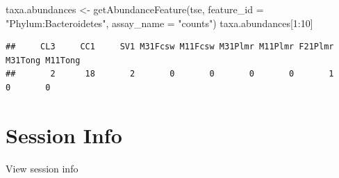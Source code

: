 \documentclass[
]{book}
\newenvironment{Shaded}{\begin{snugshade}}{\end{snugshade}}
\newcommand{\AttributeTok}[1]{\textcolor[rgb]{0.77,0.63,0.00}{#1}}
\newcommand{\DecValTok}[1]{\textcolor[rgb]{0.00,0.00,0.81}{#1}}
\newcommand{\FunctionTok}[1]{\textcolor[rgb]{0.00,0.00,0.00}{#1}}
\newcommand{\NormalTok}[1]{#1}
\newcommand{\OtherTok}[1]{\textcolor[rgb]{0.56,0.35,0.01}{#1}}
\newcommand{\SpecialCharTok}[1]{\textcolor[rgb]{0.00,0.00,0.00}{#1}}
\newcommand{\StringTok}[1]{\textcolor[rgb]{0.31,0.60,0.02}{#1}}
\begin{document}
\begin{Shaded}
\begin{Highlighting}[]
\NormalTok{taxa.abundances }\OtherTok{\textless{}{-}} \FunctionTok{getAbundanceFeature}\NormalTok{(tse, }
                                      \AttributeTok{feature\_id =} \StringTok{"Phylum:Bacteroidetes"}\NormalTok{,}
                                      \AttributeTok{assay\_name =} \StringTok{"counts"}\NormalTok{)}
\NormalTok{taxa.abundances[}\DecValTok{1}\SpecialCharTok{:}\DecValTok{10}\NormalTok{]}
\end{Highlighting}
\end{Shaded}

\begin{verbatim}
##     CL3     CC1     SV1 M31Fcsw M11Fcsw M31Plmr M11Plmr F21Plmr M31Tong M11Tong 
##       2      18       2       0       0       0       0       1       0       0
\end{verbatim}

\hypertarget{session-info-3}{%
\section*{Session Info}\label{session-info-3}}

View session info
\end{document}
